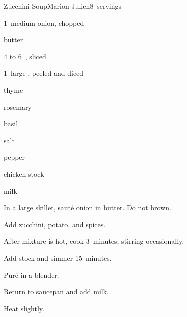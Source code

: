 \begin{recipe}{Zucchini Soup\UNTESTED}{Marion Julien}{8~servings}

\begin{ingredients}
\item 1~medium onion, chopped
\item {} butter
\item 4 to 6~, sliced
\item 1~large , peeled and diced
\item \tp{\quarter} thyme
\item \tp{\quarter} rosemary
\item \tp{\quarter} basil
\item \tp{\quarter} salt
\item pepper
\item {} chicken stock
\item {} milk
\end{ingredients}

\begin{directions}
\item In a large skillet, sauté onion in butter. Do not brown.
\item Add zucchini, potato, and spices.
\item After mixture is hot, cook 3~minutes, stirring occasionally.
\item Add stock and simmer 15~minutes.
\item Puré in a blender.
\item Return to saucepan and add milk.
\item Heat slightly.
\end{directions}

\end{recipe}
